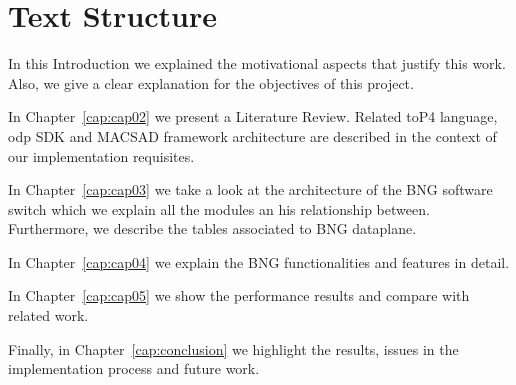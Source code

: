\section{Text Structure}
\label{sec:sec03}

In this Introduction we explained the motivational aspects that justify this work. Also, we give a clear explanation for the objectives of this project. 

In Chapter~\ref{cap:cap02} we present a Literature Review. Related  to\gls{P4} language, \gls{odp} SDK and MACSAD framework architecture are described in the context of our implementation requisites.


In Chapter~\ref{cap:cap03} we take a look at the architecture of the BNG software switch which we explain all the modules an his relationship between. Furthermore, we describe the tables associated to BNG dataplane.

In Chapter~\ref{cap:cap04} we explain the BNG functionalities and features in detail.

In Chapter~\ref{cap:cap05} we show the performance results and compare with related work.

Finally, in Chapter~\ref{cap:conclusion} we highlight the results, issues in the implementation process and future work.


